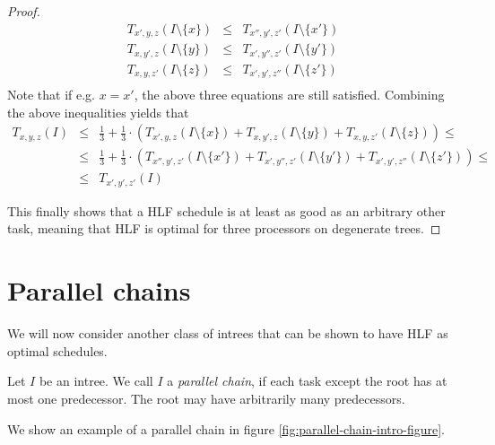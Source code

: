\begin{proof}
  \begin{eqnarray*}
    T_{x',y,z}(I\setminus\{x\})
    & \leq &
    T_{x'',y',z'}(I\setminus\{x'\}) \\
    T_{x,y',z}(I\setminus\{y\})
    & \leq &
    T_{x',y'',z'}(I\setminus\{y'\}) \\
    T_{x,y,z'}(I\setminus\{z\})
    & \leq &
    T_{x',y',z''}(I\setminus\{z'\}) \\
  \end{eqnarray*}
  Note that if e.g. $x=x'$, the above three equations are still satisfied.
  Combining the above inequalities yields that
  \begin{eqnarray*}
    T_{x,y,z}(I) 
    & \leq & 
    \frac{1}{3} + \frac{1}{3} \cdot 
    \left( 
      T_{x',y,z}(I\setminus\{x\}) +
      T_{x,y',z}(I\setminus\{y\}) +
      T_{x,y,z'}(I\setminus\{z\})
    \right) 
    \leq \\
    & \leq &
    \frac{1}{3} + \frac{1}{3} \cdot 
    \left( 
      T_{x'',y',z'}(I\setminus\{x'\}) +
      T_{x',y'',z'}(I\setminus\{y'\}) +
      T_{x',y',z''}(I\setminus\{z'\})
    \right) \leq \\
    & \leq &
    T_{x',y',z'}(I)
  \end{eqnarray*}

  This finally shows that a HLF schedule is at least as good as an arbitrary other task, meaning that HLF is optimal for three processors on degenerate trees.
\end{proof}

\section{Parallel chains}
\label{sec:p3-parallel-chains}

We will now consider another class of intrees that can be shown to have HLF as optimal schedules.

\begin{definition}
  Let $I$ be an intree. We call $I$ a \emph{parallel chain}, if each task except the root has at most one predecessor. The root may have arbitrarily many predecessors.
\end{definition}

We show an example of a parallel chain in figure \ref{fig:parallel-chain-intro-figure}.

